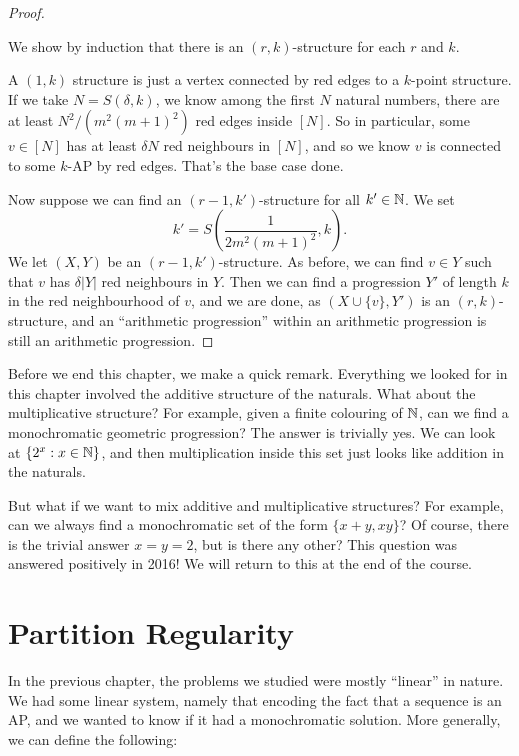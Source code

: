 \documentclass[a4paper]{article}
\begin{document}
\begin{proof}
\begin{center}
\begin{tikzpicture}
      \end{tikzpicture}
    \end{center}
    We show by induction that there is an $(r, k)$-structure for each $r$ and $k$.

    A $(1, k)$ structure is just a vertex connected by red edges to a $k$-point structure. If we take $N = S(\delta, k)$, we know among the first $N$ natural numbers, there are at least $N^2/(m^2(m + 1)^2)$ red edges inside $[N]$. So in particular, some $v \in [N]$ has at least $\delta N$ red neighbours in $[N]$, and so we know $v$ is connected to some $k$-AP by red edges. That's the base case done.

    Now suppose we can find an $(r - 1, k')$-structure for all $k' \in \N$. We set
    \[
      k' = S\left(\frac{1}{2m^2(m + 1)^2}, k\right).
    \]
    We let $(X, Y)$ be an $(r - 1, k')$-structure. As before, we can find $v \in Y$ such that $v$ has $\delta|Y|$ red neighbours in $Y$. Then we can find a progression $Y'$ of length $k$ in the red neighbourhood of $v$, and we are done, as $(X \cup \{v\}, Y')$ is an $(r, k)$-structure, and an ``arithmetic progression'' within an arithmetic progression is still an arithmetic progression.
  \end{proof}
  Before we end this chapter, we make a quick remark. Everything we looked for in this chapter involved the additive structure of the naturals. What about the multiplicative structure? For example, given a finite colouring of $\N$, can we find a monochromatic geometric progression? The answer is trivially yes. We can look at $\{2^x: x \in \N\}$, and then multiplication inside this set just looks like addition in the naturals.

  But what if we want to mix additive and multiplicative structures? For example, can we always find a monochromatic set of the form $\{x + y, xy\}$? Of course, there is the trivial answer $x = y = 2$, but is there any other? This question was answered positively in 2016! We will return to this at the end of the course.

  \section{Partition Regularity}
  In the previous chapter, the problems we studied were mostly ``linear'' in nature. We had some linear system, namely that encoding the fact that a sequence is an AP, and we wanted to know if it had a monochromatic solution. More generally, we can define the following:
\end{document}
